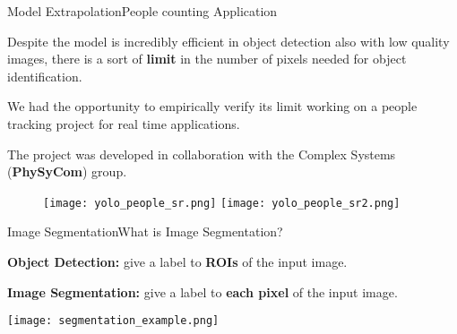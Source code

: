 \documentclass{standalone}
\begin{document}
\begin{frame}{Model Extrapolation}{People counting Application}

  \scriptsize{Despite the model is incredibly efficient in object detection also with low quality images, there is a sort of \textbf{limit} in the number of pixels needed for object identification.}

  \scriptsize{We had the opportunity to empirically verify its limit working on a people tracking project for real time applications.}

  \scriptsize{The project was developed in collaboration with the Complex Systems (\textbf{PhySyCom}) group.}

  \begin{figure}
    \begin{overprint}
      \centering\texttt{[image: yolo\_people\_sr.png]}
      \centering\texttt{[image: yolo\_people\_sr2.png]}
    \end{overprint}
  \end{figure}

\end{frame}



\begin{frame}{Image Segmentation}{What is Image Segmentation?}

  \scriptsize{\textbf{Object Detection:} give a label to \textbf{ROIs} of the input image.}

  \scriptsize{\textbf{Image Segmentation:} give a label to \textbf{each pixel} of the input image.}

  \vfill

  \centering\texttt{[image: segmentation\_example.png]}

\end{frame}
\end{document}

